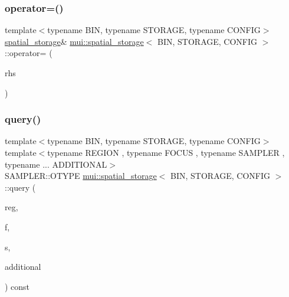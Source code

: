 \mbox{\label{classmui_1_1spatial__storage_aa7c34670ff584fcf64533cd8980522a2}} 
\subsubsection{\texorpdfstring{operator=()}{operator=()}}
{\footnotesize\ttfamily template$<$typename B\+IN, typename S\+T\+O\+R\+A\+GE, typename C\+O\+N\+F\+IG$>$ \\
\hyperlink{classmui_1_1spatial__storage}{spatial\+\_\+storage}\& \hyperlink{classmui_1_1spatial__storage}{mui\+::spatial\+\_\+storage}$<$ B\+IN, S\+T\+O\+R\+A\+GE, C\+O\+N\+F\+IG $>$\+::operator= (\begin{DoxyParamCaption}\item[{\hyperlink{classmui_1_1spatial__storage}{spatial\+\_\+storage}$<$ B\+IN, S\+T\+O\+R\+A\+GE, C\+O\+N\+F\+IG $>$}]{rhs }\end{DoxyParamCaption})\hspace{0.3cm}{\ttfamily [inline]}}

\mbox{\label{classmui_1_1spatial__storage_aeac746bbdb7df7a649d3f56e2c3b0691}} 
\subsubsection{\texorpdfstring{query()}{query()}}
{\footnotesize\ttfamily template$<$typename B\+IN, typename S\+T\+O\+R\+A\+GE, typename C\+O\+N\+F\+IG$>$ \\
template$<$typename R\+E\+G\+I\+ON , typename F\+O\+C\+US , typename S\+A\+M\+P\+L\+ER , typename ... A\+D\+D\+I\+T\+I\+O\+N\+AL$>$ \\
S\+A\+M\+P\+L\+E\+R\+::\+O\+T\+Y\+PE \hyperlink{classmui_1_1spatial__storage}{mui\+::spatial\+\_\+storage}$<$ B\+IN, S\+T\+O\+R\+A\+GE, C\+O\+N\+F\+IG $>$\+::query (\begin{DoxyParamCaption}\item[{const R\+E\+G\+I\+ON \&}]{reg,  }\item[{const F\+O\+C\+US \&}]{f,  }\item[{const S\+A\+M\+P\+L\+ER \&}]{s,  }\item[{A\+D\+D\+I\+T\+I\+O\+N\+AL \&\&...}]{additional }\end{DoxyParamCaption}) const\hspace{0.3cm}{\ttfamily [inline]}}

